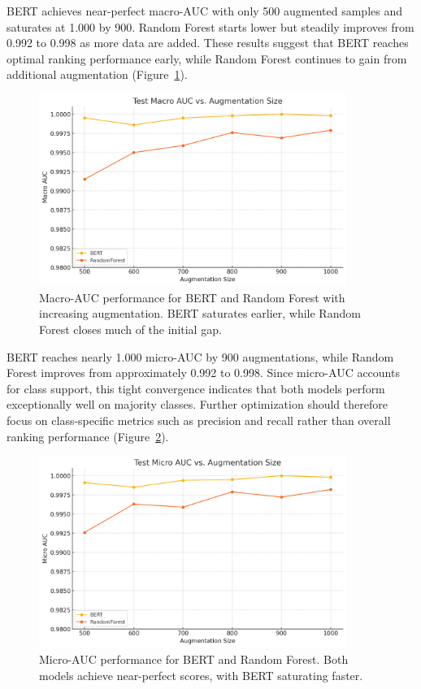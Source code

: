 \documentclass{article}
\begin{document}
BERT achieves near-perfect macro-AUC with only 500 augmented samples and saturates at 1.000 by 900. Random Forest starts lower but steadily improves from 0.992 to 0.998 as more data are added. These results suggest that BERT reaches optimal ranking performance early, while Random Forest continues to gain from additional augmentation (Figure~\ref{fig:macro_auc}).


\begin{figure}[H]
    \centering
    \includegraphics[width=10cm]{output (4).png}
    \caption{Macro-AUC performance for BERT and Random Forest with increasing augmentation. BERT saturates earlier, while Random Forest closes much of the initial gap.}
    \label{fig:macro_auc}
\end{figure}

BERT reaches nearly 1.000 micro-AUC by 900 augmentations, while Random Forest improves from approximately 0.992 to 0.998. Since micro-AUC accounts for class support, this tight convergence indicates that both models perform exceptionally well on majority classes. Further optimization should therefore focus on class-specific metrics such as precision and recall rather than overall ranking performance (Figure~\ref{fig:micro_auc}).


\begin{figure}[H]
    \centering
    \includegraphics[width=10cm]{output (6).png}
    \caption{Micro-AUC performance for BERT and Random Forest. Both models achieve near-perfect scores, with BERT saturating faster.}
    \label{fig:micro_auc}
\end{figure}
\end{document}
